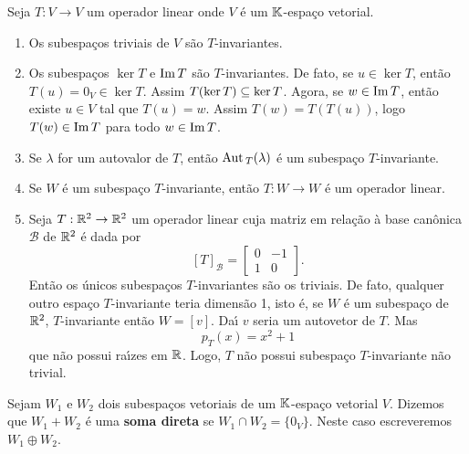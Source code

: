 \begin{exemplo}
Seja $T : V \to V$ um operador linear onde $V$ \'e um $\mathbb{K}$-espa\c{c}o vetorial.
	\begin{enumerate}
		\item Os subespa\c{c}os triviais de $V$ s\~ao $T$-invariantes.
		\item Os subespa\c{c}os $\ker T$ e ${\rm Im\,} T$ s\~ao $T$-invariantes. De fato, se $u \in \ker T$, ent\~ao $T(u) = 0_V \in \ker T$. Assim $T(\ker T) \subseteq \ker T$. Agora, se $w \in {\rm Im\,} T$, ent\~ao existe $u \in V$ tal que $T(u) = w$. Assim $T(w) = T(T(u))$, logo $T(w) \in {\rm Im\,} T$ para todo $w \in {\rm Im\,} T$.
		\item Se $\lambda$ for um autovalor de $T$, ent\~ao ${\rm Aut\,}_T(\lambda)$ \'e um subespa\c{c}o $T$-invariante.
		\item Se $W$ \'e um subespa\c{c}o $T$-invariante, ent\~ao $T : W \to W$ \'e um operador linear.
		\item Seja $T : \mathbb{R}^2 \to \mathbb{R}^2$ um operador linear cuja matriz em rela\c{c}\~ao \`a base can\^onica $\mathcal{B}$ de $\mathbb{R}^2$ \'e dada por
		\[
			[T]_\mathcal{B} = \begin{bmatrix}
				0 & -1\\
				1 & 0
			\end{bmatrix}.
		\]
		Ent\~ao os \'unicos subespa\c{c}os $T$-invariantes s\~ao os triviais. De fato, qualquer outro espa\c{c}o $T$-invariante teria dimens\~ao 1, isto \'e, se $W$ \'e um subespa\c{c}o de $\mathbb{R}^2$, $T$-invariante ent\~ao $W = [v]$. Da{\'\i} $v$ seria um autovetor de $T$. Mas
		\[
			p_T(x) = x^2 + 1
		\]
		que n\~ao possui ra{\'\i}zes em $\mathbb{R}$. Logo, $T$ n\~ao possui subespa\c{c}o $T$-invariante n\~ao trivial.
	\end{enumerate}
\end{exemplo}

\begin{definicao}
	Sejam $W_1$ e $W_2$ dois subespa\c{c}os vetoriais de um $\mathbb{K}$-espa\c{c}o vetorial $V$. Dizemos que $W_1 + W_2$ \'e uma \textbf{soma direta} se $W_1 \cap W_2 = \{0_V\}$. Neste caso escreveremos $W_1 \oplus W_2$.
\end{definicao}

